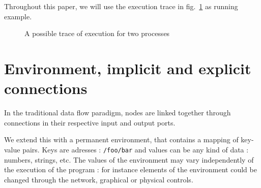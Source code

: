 \documentclass{article}
\begin{document}

    
    Throughout this paper, we will use the execution trace in fig.~\ref{fig.simple} as running example. 
    \begin{figure}
        \centering
        \caption{A possible trace of execution for two processes}
        \label{fig.simple}
    \end{figure}
	
	\section{Environment, implicit and explicit connections}
    In the traditional data flow paradigm, nodes are linked together through connections in their respective input and output ports.
    
    We extend this with a permanent environment, that contains a mapping of key-value pairs. 
    Keys are adresses : \lstinline|/foo/bar| and values can be any kind of data : numbers, strings, etc. 
    The values of the environment may vary independently of the execution of the program : for instance elements of the environment could be changed through the network, graphical or physical controls.
    
\end{document}
